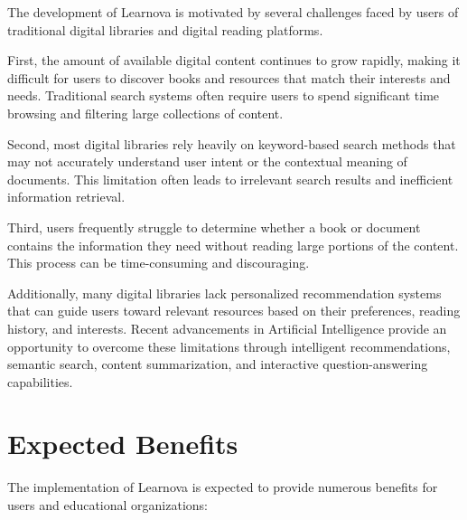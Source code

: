 The development of Learnova is motivated by several challenges faced by users
of traditional digital libraries and digital reading platforms.

First, the amount of available digital content continues to grow rapidly,
making it difficult for users to discover books and resources that match their
interests and needs. Traditional search systems often require users to spend
significant time browsing and filtering large collections of content.

Second, most digital libraries rely heavily on keyword-based search methods
that may not accurately understand user intent or the contextual meaning of
documents. This limitation often leads to irrelevant search results and
inefficient information retrieval.

Third, users frequently struggle to determine whether a book or document
contains the information they need without reading large portions of the
content. This process can be time-consuming and discouraging.

Additionally, many digital libraries lack personalized recommendation systems
that can guide users toward relevant resources based on their preferences,
reading history, and interests. Recent advancements in Artificial Intelligence
provide an opportunity to overcome these limitations through intelligent
recommendations, semantic search, content summarization, and interactive
question-answering capabilities.

\section{Expected Benefits}
\label{sec:benefits}

The implementation of Learnova is expected to provide numerous benefits for
users and educational organizations:

